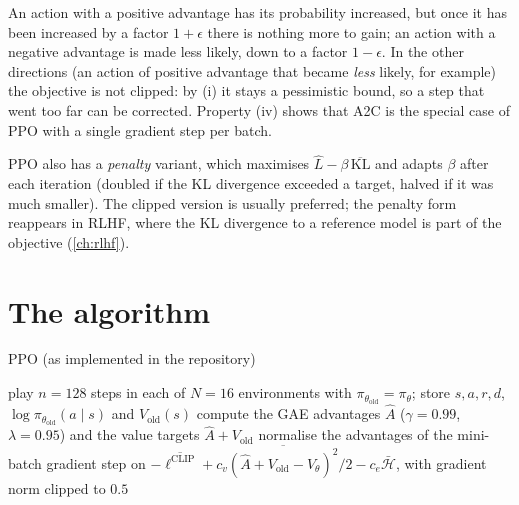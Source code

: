 \begin{intuition}
  An action with a positive advantage has its probability increased, but
  once it has been increased by a factor $1 + \epsilon$ there is nothing
  more to gain; an action with a negative advantage is made less likely,
  down to a factor $1 - \epsilon$. In the other directions (an action of
  positive advantage that became \emph{less} likely, for example) the
  objective is not clipped: by (i) it stays a pessimistic bound, so a step
  that went too far can be corrected. Property (iv) shows that A2C is the
  special case of PPO with a single gradient step per batch.
\end{intuition}

PPO also has a \emph{penalty} variant, which maximises $\hat L - \beta\,
\overline{\mathrm{KL}}$ and adapts $\beta$ after each iteration (doubled if
the KL divergence exceeded a target, halved if it was much smaller). The
clipped version is usually preferred; the penalty form reappears in RLHF,
where the KL divergence to a reference model is part of the objective
(\cref{ch:rlhf}).

\section{The algorithm}

\begin{algobox}{PPO (as implemented in the repository)}
  \begin{algorithmic}[1]
      \State play $n = 128$ steps in each of $N = 16$ environments with
        $\pi_{\theta_{\mathrm{old}}} = \pi_\theta$; store $s, a, r, d$,
        $\log \pi_{\theta_{\mathrm{old}}}(a \mid s)$ and $V_{\mathrm{old}}(s)$
      \State compute the GAE advantages $\hat A$ ($\gamma = 0.99$,
        $\lambda = 0.95$) and the value targets $\hat A + V_{\mathrm{old}}$
          \State normalise the advantages of the mini-batch
          \State gradient step on $-\overline{\ell^{\mathrm{CLIP}}} + c_v
            \overline{(\hat A + V_{\mathrm{old}} - V_\theta)^2} / 2 - c_e
            \bar{\mathcal{H}}$, with gradient norm clipped to $0.5$
        \EndFor
      \EndFor
    \EndFor
  \end{algorithmic}
\end{algobox}


